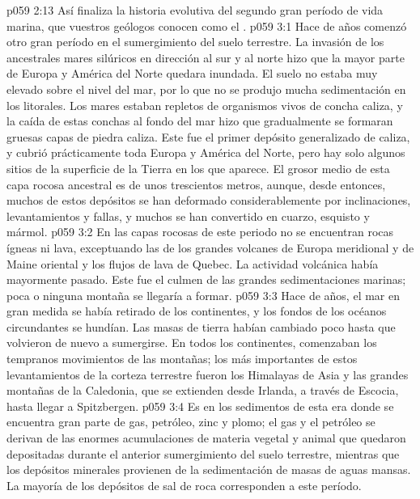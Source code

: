 \vs p059 2:13 \pc Así finaliza la historia evolutiva del segundo gran período de vida marina, que vuestros geólogos conocen como el .
\vs p059 3:1 Hace  de años comenzó otro gran período en el sumergimiento del suelo terrestre. La invasión de los ancestrales mares silúricos en dirección al sur y al norte hizo que la mayor parte de Europa y América del Norte quedara inundada. El suelo no estaba muy elevado sobre el nivel del mar, por lo que no se produjo mucha sedimentación en los litorales. Los mares estaban repletos de organismos vivos de concha caliza, y la caída de estas conchas al fondo del mar hizo que gradualmente se formaran gruesas capas de piedra caliza. Este fue el primer depósito generalizado de caliza, y cubrió prácticamente toda Europa y América del Norte, pero hay solo algunos sitios de la superficie de la Tierra en los que aparece. El grosor medio de esta capa rocosa ancestral es de unos trescientos metros, aunque, desde entonces, muchos de estos depósitos se han deformado considerablemente por inclinaciones, levantamientos y fallas, y muchos se han convertido en cuarzo, esquisto y mármol.
\vs p059 3:2 En las capas rocosas de este periodo no se encuentran rocas ígneas ni lava, exceptuando las de los grandes volcanes de Europa meridional y de Maine oriental y los flujos de lava de Quebec. La actividad volcánica había mayormente pasado. Este fue el culmen de las grandes sedimentaciones marinas; poca o ninguna montaña se llegaría a formar.
\vs p059 3:3 \pc Hace  de años, el mar en gran medida se había retirado de los continentes, y los fondos de los océanos circundantes se hundían. Las masas de tierra habían cambiado poco hasta que volvieron de nuevo a sumergirse. En todos los continentes, comenzaban los tempranos movimientos de las montañas; los más importantes de estos levantamientos de la corteza terrestre fueron los Himalayas de Asia y las grandes montañas de la Caledonia, que se extienden desde Irlanda, a través de Escocia, hasta llegar a Spitzbergen.
\vs p059 3:4 Es en los sedimentos de esta era donde se encuentra gran parte de gas, petróleo, zinc y plomo; el gas y el petróleo se derivan de las enormes acumulaciones de materia vegetal y animal que quedaron depositadas durante el anterior sumergimiento del suelo terrestre, mientras que los depósitos minerales provienen de la sedimentación de masas de aguas mansas. La mayoría de los depósitos de sal de roca corresponden a este período.
